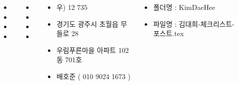 \documentclass[	20pt, 
							a1paper, 
							portrait, %
							margin=0mm, %
							innermargin=10mm,  		%
							colspace=5mm, 
							subcolspace=0mm
							]{tikzposter}
\begin{document}
\begin{columns}
{\begin{LARGE}
\begin{itemize}
					\end{itemize}
				\end{LARGE}
			}



			{
				\begin{LARGE}
					\begin{itemize}
					\item 
					\item 
					\item 
					\item 
					\end{itemize}
				\end{LARGE}
			}


			{
				\begin{LARGE}
					\begin{itemize}
					\item 
					\item 
					\item 
					\item 
					\end{itemize}
				\end{LARGE}
			}


			{
				\begin{LARGE}
					\begin{itemize}
					\item 우)  12 735
					\item 경기도 광주시 초월읍 무들로 28
					\item 우림푸른마을 아파트 102동 701호
					\item 배호준 ( 010 9024 1673 )
					\end{itemize}
				\end{LARGE}
			}


			{
				\begin{LARGE}
					\begin{itemize}
					\item 폴더명 : KimDaeHee
					\item 파일명 : 김대희-체크리스트-포스트.tex
					\end{itemize}
				\end{LARGE}
			}



	\end{columns}
\end{document}
